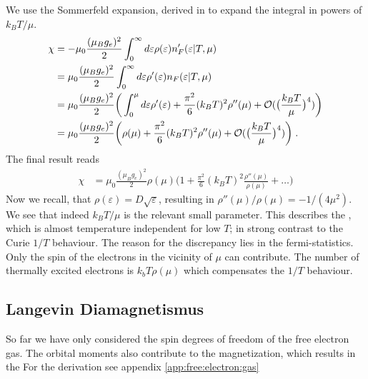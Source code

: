 We use the Sommerfeld expansion, derived in  to expand the integral in powers of $k_{B}T/\mu$. 
%
\begin{align*}
\chi &=-\mu_{0}\frac{(\mu_{B}g_{e})^{2} }{2}  \int_{0}^{\infty}d\varepsilon \rho(\varepsilon)  n'_{F}(\varepsilon|T,\mu)\notag\\
&=\mu_{0}\frac{(\mu_{B}g_{e})^{2} }{2}  \int_{0}^{\infty}d\varepsilon \rho'(\varepsilon)  n_{F}(\varepsilon|T,\mu)\\
 &=\mu_{0}\frac{(\mu_{B}g_{e})^{2} }{2}  \bigg(\int_{0}^{\mu}d\varepsilon \rho'(\varepsilon)
+\frac{\pi^{2}}{6}(k_{B}T)^{2}\rho''(\mu)+ {\cal O}(\big(\frac{k_{B}T}{\mu}\big)^{4})
 \bigg)\\    
  &=\mu_{0}\frac{(\mu_{B}g_{e})^{2} }{2}  \bigg( \rho(\mu)
+\frac{\pi^{2}}{6}(k_{B}T)^{2}\rho''(\mu)+ {\cal O}(\big(\frac{k_{B}T}{\mu}\big)^{4})
 \bigg)\;.
\end{align*}
%
The final result reads
%
\begin{align}\label{eq:para:chi}
\chi   &=\mu_{0}\frac{(\mu_{B}g_{e})^{2} }{2}  \rho(\mu)\bigg( 1
+\frac{\pi^{2}}{6}(k_{B}T)^{2}\frac{\rho''(\mu)}{\rho(\mu)}+\ldots
 \bigg)
\end{align}
%
Now we recall, that $\rho(\varepsilon) = D \sqrt{\varepsilon}$, resulting in
$\rho''(\mu)/\rho(\mu)=-1/(4\mu^{2})$. 
%
%
We see that indeed $k_{B}T/\mu$ is the relevant small parameter.
This describes the , which is almost temperature
independent for low $T$; in strong contrast to the Curie $1/T$ behaviour.
The reason for the discrepancy lies in the fermi-statistics. Only the spin of the electrons in the vicinity of $\mu$ can contribute. The number of thermally excited electrons
is $k_{b} T \rho(\mu)$ which compensates the $1/T$ behaviour.


\subsection{Langevin Diamagnetismus}
So far we have only considered the spin degrees of freedom of the free electron gas. The orbital moments also contribute to the magnetization, which results in the
For the derivation see appendix \ref{app:free:electron:gas}


